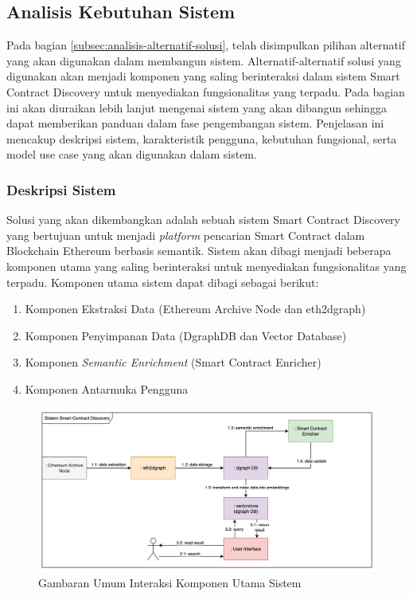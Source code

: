\subsection{Analisis Kebutuhan Sistem}

Pada bagian \ref{subsec:analisis-alternatif-solusi}, telah disimpulkan pilihan alternatif yang akan digunakan dalam membangun sistem. Alternatif-alternatif solusi yang digunakan akan menjadi komponen yang saling berinteraksi dalam sistem Smart Contract Discovery untuk menyediakan fungsionalitas yang terpadu. Pada bagian ini akan diuraikan lebih lanjut mengenai sistem yang akan dibangun sehingga dapat memberikan panduan dalam fase pengembangan sistem. Penjelasan ini mencakup deskripsi sistem, karakteristik pengguna, kebutuhan fungsional, serta model use case yang akan digunakan dalam sistem.

\subsubsection{Deskripsi Sistem}

Solusi yang akan dikembangkan adalah sebuah sistem Smart Contract Discovery yang bertujuan untuk menjadi \textit{platform} pencarian Smart Contract dalam Blockchain Ethereum berbasis semantik. Sistem akan dibagi menjadi beberapa komponen utama yang saling berinteraksi untuk menyediakan fungsionalitas yang terpadu. Komponen utama sistem dapat dibagi sebagai berikut:

\begin{enumerate}
	\item Komponen Ekstraksi Data (Ethereum Archive Node dan eth2dgraph)
	\item Komponen Penyimpanan Data (DgraphDB dan Vector Database)
	\item Komponen \textit{Semantic Enrichment} (Smart Contract Enricher)
	\item Komponen Antarmuka Pengguna
\end{enumerate}

\begin{figure}[ht]
	\centering
	\includegraphics[width=1\textwidth]{resources/chapter-3/komponen-utama-new.png}
	\caption{Gambaran Umum Interaksi Komponen Utama Sistem}
	\label{image:komponen-sistem}
\end{figure}

